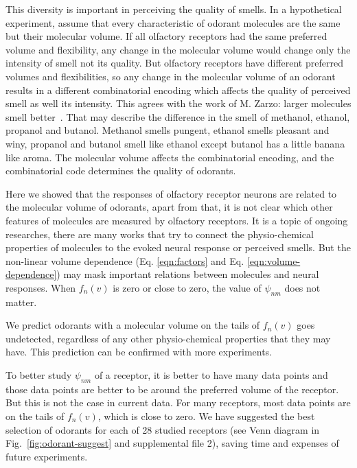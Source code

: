 \documentclass[11pt]{article} %
\newcommand{\numberofreceptors}{ 28 }
\begin{document}
This diversity is important in perceiving the quality of smells. 
In a hypothetical experiment, 
assume that every characteristic of odorant molecules are the same but their molecular volume.
If all olfactory receptors had the same preferred volume and flexibility, 
any change in the molecular volume would change only the intensity of smell not its quality.
But olfactory receptors have different preferred volumes and flexibilities, 
so any change in the molecular volume of an odorant results in a different combinatorial encoding which affects the quality of perceived smell as well its intensity.
This agrees with the work of M. Zarzo: larger molecules  smell better~\cite{zarzo2011}.
That may describe the difference in the smell of methanol, ethanol, propanol and butanol. 
Methanol smells pungent, ethanol smells pleasant and winy, propanol and butanol smell like ethanol except butanol  has a little banana like aroma.
The molecular volume affects the combinatorial encoding, 
and the combinatorial code determines the quality of odorants.

Here we showed that the responses of olfactory receptor neurons are related to the molecular volume of odorants, 
apart from that, it is not clear which other features of molecules are measured by olfactory receptors. 
It is a topic of ongoing researches, 
there are many works that try to connect the physio-chemical properties of molecules to the evoked neural response or perceived smells.
But the non-linear volume dependence (Eq. \ref{eqn:factors} and Eq. \ref{eqn:volume-dependence})  
may mask important relations between molecules and neural responses.
When $f_n(v)$ is zero or close to zero, 
the value of $\psi_{nm}$ does not matter. 

We predict odorants with a molecular volume on the tails of $f_n(v)$ goes undetected, 
regardless of any other physio-chemical properties that they may have. 
This prediction can be confirmed with more experiments. 

To better study $\psi_{nm}$ of a receptor, 
it is better to have many data points and those data points are better to be around the preferred volume of the receptor.
But this is not the case in current data. 
For many receptors, 
most data points are on the tails of $f_n(v)$, which is close to zero.
We have suggested the best selection of odorants for each of \numberofreceptors studied receptors 
(see Venn diagram in Fig.~\ref{fig:odorant-suggest} and supplemental file 2), 
saving time and expenses of future experiments. 
\end{document}
